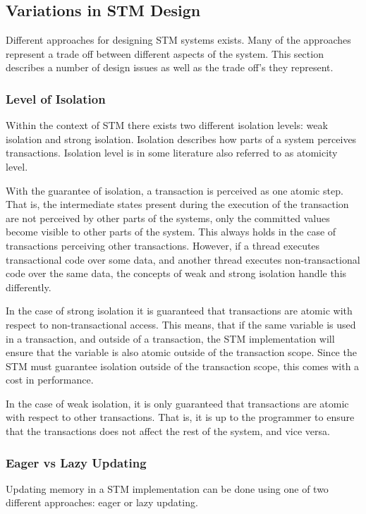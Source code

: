 \subsection{Variations in \ac{STM} Design}
Different approaches for designing \ac{STM} systems exists. Many of the approaches represent a trade off between different aspects of the system. This section describes a number of design issues as well as the trade off's they represent.

\subsubsection{Level of Isolation}
\label{subsec:isolation_level}
Within the context of \ac{STM} there exists two different isolation levels: weak isolation and strong isolation. Isolation describes how parts of a system perceives transactions. Isolation level is in some literature also referred to as atomicity level\cite[p. 30]{harris2010transactional}.

With the guarantee of isolation, a transaction is perceived as one atomic step. That is, the intermediate states present during the execution of the transaction are not perceived by other parts of the systems, only the committed values become visible to other parts of the system. This always holds in the case of transactions perceiving other transactions. However, if a thread executes transactional code over some data, and another thread executes non-transactional code over the same data, the concepts of weak and strong isolation handle this differently.

In the case of strong isolation it is guaranteed that transactions are atomic with respect to non-transactional access\cite[p. 2083]{herlihy2011tm}. This means, that if the same variable is used in a transaction, and outside of a transaction, the \ac{STM} implementation will ensure that the variable is also atomic outside of the transaction scope. Since the \ac{STM} must guarantee isolation outside of the transaction scope, this comes with a cost in performance\cite{herlihy2011tm}. 

In the case of weak isolation, it is only guaranteed that transactions are atomic with respect to other transactions. That is, it is up to the programmer to ensure that the transactions does not affect the rest of the system, and vice versa. 

\subsubsection{Eager vs Lazy Updating}
Updating memory in a \ac{STM} implementation can be done using one of two different approaches: eager or lazy updating.

